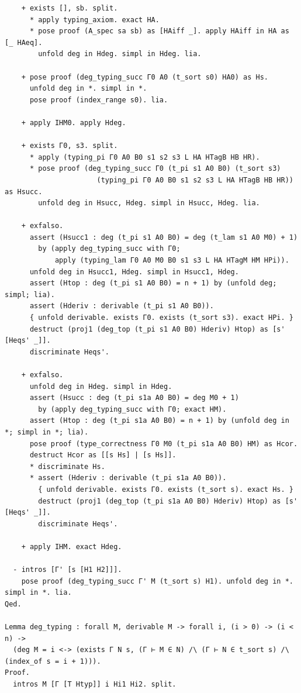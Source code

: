 \begin{latin}
\begin{verbatim}
    + exists [], sb. split.
      * apply typing_axiom. exact HA.
      * pose proof (A_spec sa sb) as [HAiff _]. apply HAiff in HA as [_ HAeq].
        unfold deg in Hdeg. simpl in Hdeg. lia.

    + pose proof (deg_typing_succ Γ0 A0 (t_sort s0) HA0) as Hs.
      unfold deg in *. simpl in *.
      pose proof (index_range s0). lia.

    + apply IHM0. apply Hdeg.

    + exists Γ0, s3. split.
      * apply (typing_pi Γ0 A0 B0 s1 s2 s3 L HA HTagB HB HR).
      * pose proof (deg_typing_succ Γ0 (t_pi s1 A0 B0) (t_sort s3)
                      (typing_pi Γ0 A0 B0 s1 s2 s3 L HA HTagB HB HR)) as Hsucc.
        unfold deg in Hsucc, Hdeg. simpl in Hsucc, Hdeg. lia.

    + exfalso.
      assert (Hsucc1 : deg (t_pi s1 A0 B0) = deg (t_lam s1 A0 M0) + 1)
        by (apply deg_typing_succ with Γ0;
            apply (typing_lam Γ0 A0 M0 B0 s1 s3 L HA HTagM HM HPi)).
      unfold deg in Hsucc1, Hdeg. simpl in Hsucc1, Hdeg.
      assert (Htop : deg (t_pi s1 A0 B0) = n + 1) by (unfold deg; simpl; lia).
      assert (Hderiv : derivable (t_pi s1 A0 B0)).
      { unfold derivable. exists Γ0. exists (t_sort s3). exact HPi. }
      destruct (proj1 (deg_top (t_pi s1 A0 B0) Hderiv) Htop) as [s' [Heqs' _]].
      discriminate Heqs'.

    + exfalso.
      unfold deg in Hdeg. simpl in Hdeg.
      assert (Hsucc : deg (t_pi s1a A0 B0) = deg M0 + 1)
        by (apply deg_typing_succ with Γ0; exact HM).
      assert (Htop : deg (t_pi s1a A0 B0) = n + 1) by (unfold deg in *; simpl in *; lia).
      pose proof (type_correctness Γ0 M0 (t_pi s1a A0 B0) HM) as Hcor.
      destruct Hcor as [[s Hs] | [s Hs]].
      * discriminate Hs.
      * assert (Hderiv : derivable (t_pi s1a A0 B0)).
        { unfold derivable. exists Γ0. exists (t_sort s). exact Hs. }
        destruct (proj1 (deg_top (t_pi s1a A0 B0) Hderiv) Htop) as [s' [Heqs' _]].
        discriminate Heqs'.

    + apply IHM. exact Hdeg.

  - intros [Γ' [s [H1 H2]]].
    pose proof (deg_typing_succ Γ' M (t_sort s) H1). unfold deg in *. simpl in *. lia.
Qed.

Lemma deg_typing : forall M, derivable M -> forall i, (i > 0) -> (i < n) ->
  (deg M = i <-> (exists Γ N s, (Γ ⊢ M ∈ N) /\ (Γ ⊢ N ∈ t_sort s) /\ (index_of s = i + 1))).
Proof.
  intros M [Γ [T Htyp]] i Hi1 Hi2. split.


\end{verbatim}
\end{latin}

